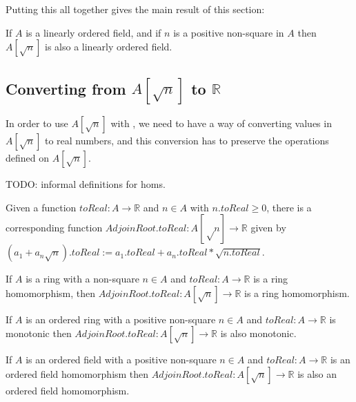 Putting this all together gives the main result of this section:

\begin{theorem}
  \label{thm:adjoinOrderedField}

  If $A$ is a linearly ordered field, and if $n$ is a positive non-square in $A$
  then $A[\sqrt{n}]$ is also a linearly ordered field.
\end{theorem}

\subsection{Converting from $A[\sqrt{n}]$ to $ℝ$}

In order to use $A[\sqrt{n}]$ with , we need to have a way of
converting values in $A[\sqrt{n}]$ to real numbers, and this conversion has to preserve
the operations defined on $A[\sqrt{n}]$.

TODO: informal definitions for homs.


\begin{definition}
  \label{def:adjoinToReal}
  Given a function $toReal : A → ℝ$ and $n ∈ A$ with $n.toReal \geq 0$,
  there is a corresponding function $AdjoinRoot.toReal : A[√n] → ℝ$ given by
  $(a_1 + a_n\sqrt{n}).toReal := a_1.toReal + a_n.toReal * \sqrt{n.toReal}$.
\end{definition}

\begin{lemma}
  \label{thm:adjoinToRealRingHom}
  If $A$ is a ring with a non-square $n ∈ A$ and $toReal : A → ℝ$ is a
  ring homomorphism, then $AdjoinRoot.toReal : A[\sqrt{n}] → ℝ$ is a ring
  homomorphism.
\end{lemma}

\begin{lemma}
  \label{thm:adjoinToRealOrderHom}
  If $A$ is an ordered ring with a positive non-square $n ∈ A$ and
  $toReal : A → ℝ$ is monotonic then $AdjoinRoot.toReal : A[\sqrt{n}] → ℝ$ is
  also monotonic.
\end{lemma}


\begin{lemma}
  \label{thm:adjoinToRealOrderedFieldHom}
  If $A$ is an ordered field with a positive non-square $n ∈ A$ and $toReal : A
  → ℝ$ is an ordered field homomorphism then $AdjoinRoot.toReal : A[\sqrt{n}] →
  ℝ$ is also an ordered field homomorphism.
\end{lemma}


